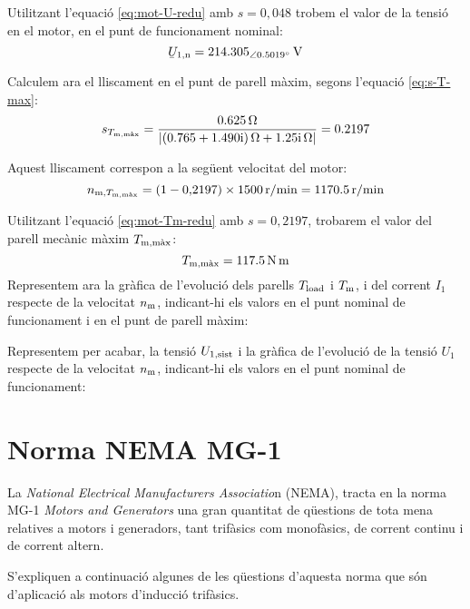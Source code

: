 \begin{exemple}
	Utilitzant l'equació \eqref{eq:mot-U-redu} amb $s=0{,}048$ trobem el valor de la tensió en el motor, en el punt de funcionament nominal:
	\[
		\cmplx{U}\ped{1,n} = \qtypd{214,305}{0,5019}{V}
	\]
	
	Calculem ara el lliscament en el punt de parell màxim, segons l'equació \eqref{eq:s-T-max}:
	\[
		s_{T\ped{m,\text{màx}}} =  \frac{\qty{0,625}{\ohm}}{|\complexqty{0,765+j1,490}{\ohm} + \complexqty{j1,25}{\ohm}|} = \num{0,2197} 
	\]
	
	Aquest lliscament correspon a la següent  velocitat del motor:
	\[
		n_{\text{m},T_\mathrm{m,\text{màx}}} = (1 - 0{,}2197) \times \qty{1500}{r/min} = \qty{1170,5}{r/min}
	\]
	
	Utilitzant l'equació  \eqref{eq:mot-Tm-redu} amb $s=0{,}2197$, trobarem el valor del parell mecànic màxim  $T_\mathrm{m,\text{màx}}$:
	\[
		T_\mathrm{m,\text{màx}} = \qty{117,5}{N.m}
	\]
	Representem ara la gràfica de l'evolució dels parells $T_\mathrm{load}$ i   $T_\mathrm{m}$, i del	corrent $I_1$ respecte de la velocitat $n_\mathrm{m}$, indicant-hi els valors en el punt nominal de funcionament i en el punt de parell màxim:
	
	\begin{center}
		\fontsize{10pt}{11pt}\selectfont
		
	\end{center}

	Representem per acabar, la tensió $U_\mathrm{1,sist}$ i la gràfica de l'evolució de la tensió $U_1$ respecte de la velocitat $n_\mathrm{m}$, indicant-hi els valors en el punt nominal de funcionament:
	
	\begin{center}
		\fontsize{10pt}{11pt}\selectfont
		
	\end{center}

\end{exemple}	

	    
\section{Norma NEMA MG-1}

La \textit{National Electrical Manufacturers Associatio}n (NEMA),
tracta en la norma  MG-1 \textit{Motors and Generators} una gran quantitat de qüestions de tota mena relatives a motors i generadors, tant trifàsics com monofàsics, de corrent continu i de corrent altern.

S'expliquen a continuació algunes de les qüestions d'aquesta norma que són d'aplicació als motors d'inducció trifàsics.

